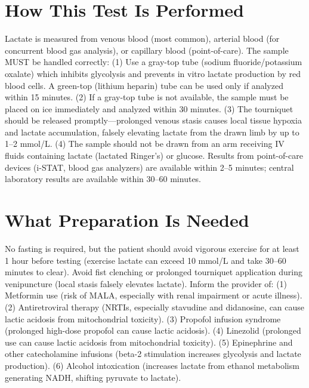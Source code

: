\section*{How This Test Is Performed}
Lactate is measured from venous blood (most common), arterial blood (for concurrent blood gas analysis), or capillary blood (point-of-care). The sample MUST be handled correctly: (1) Use a gray-top tube (sodium fluoride/potassium oxalate) which inhibits glycolysis and prevents in vitro lactate production by red blood cells. A green-top (lithium heparin) tube can be used only if analyzed within 15 minutes. (2) If a gray-top tube is not available, the sample must be placed on ice immediately and analyzed within 30 minutes. (3) The tourniquet should be released promptly---prolonged venous stasis causes local tissue hypoxia and lactate accumulation, falsely elevating lactate from the drawn limb by up to 1--2 mmol/L. (4) The sample should not be drawn from an arm receiving IV fluids containing lactate (lactated Ringer's) or glucose. Results from point-of-care devices (i-STAT, blood gas analyzers) are available within 2--5 minutes; central laboratory results are available within 30--60 minutes.

\section*{What Preparation Is Needed}
No fasting is required, but the patient should avoid vigorous exercise for at least 1 hour before testing (exercise lactate can exceed 10 mmol/L and take 30--60 minutes to clear). Avoid fist clenching or prolonged tourniquet application during venipuncture (local stasis falsely elevates lactate). Inform the provider of: (1) Metformin use (risk of MALA, especially with renal impairment or acute illness). (2) Antiretroviral therapy (NRTIs, especially stavudine and didanosine, can cause lactic acidosis from mitochondrial toxicity). (3) Propofol infusion syndrome (prolonged high-dose propofol can cause lactic acidosis). (4) Linezolid (prolonged use can cause lactic acidosis from mitochondrial toxicity). (5) Epinephrine and other catecholamine infusions (beta-2 stimulation increases glycolysis and lactate production). (6) Alcohol intoxication (increases lactate from ethanol metabolism generating NADH, shifting pyruvate to lactate).

